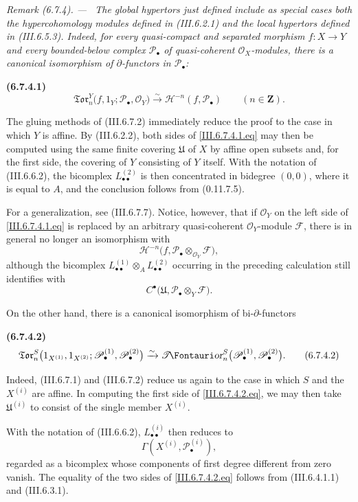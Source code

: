 \documentclass[10pt,oneside]{book}
\newcommand{\sh}[1]{\mathscr{#1}}
\newcommand{\shTor}{\sh{T}\textup{\kern-2.2pt{\Fontauri\slshape or}}}
\newcommand{\sref}[2][]{(#2)}
\newcommand{\oldpage}[2][]{\setcounter{footnote}{0}\marginpar{\scriptsize\textbf{#1}~|~#2}\ignorespaces}
\newenvironment{env}[1][]{\par\medskip\noindent\textbf{(#1)}\ }{\par}
\newenvironment{remark}[1][]{\par\medskip\noindent\itshape Remark (#1). ---\ }{\par}
\begin{document}
\begin{remark}[6.7.4]
\label{III.6.7.4}
The global hypertors just defined include as special cases both
the hypercohomology modules defined in \sref{III.6.2.1} and the
local hypertors defined in \sref{III.6.5.3}.  Indeed, for every
quasi-compact and separated morphism $f:X\to Y$ and every
bounded-below complex $\sh P_\bullet$ of quasi-coherent
$\sh O_X$-modules, there is a canonical isomorphism of
$\partial$-functors in $\sh P_\bullet$:
\begin{env}[6.7.4.1]
\label{III.6.7.4.1}
\[
  \mathfrak{Tor}_n^Y
  \bigl(
    f,1_Y;
    \sh P_\bullet,\sh O_Y
  \bigr)
  \xrightarrow{\sim}
  \sh H^{-n}(f,\sh P_\bullet)
  \qquad(n\in\mathbf Z).
  \tag{6.7.4.1}\label{III.6.7.4.1.eq}
\]
\end{env}
The gluing methods of \sref{III.6.7.2} immediately reduce the
proof to the case in which $Y$ is affine.  By
\sref{III.6.2.2}, both sides of
\eqref{III.6.7.4.1.eq} may then be computed using the same
finite covering $\mathfrak U$ of $X$ by affine open subsets and,
for the first side, the covering of $Y$ consisting of $Y$
itself.  With the notation of \sref{III.6.6.2}, the bicomplex
$L_{\bullet\bullet}^{(2)}$ is then concentrated in bidegree
$(0,0)$, where it is equal to $A$, and the conclusion follows
from \sref[0]{0.11.7.5}.

For a generalization, see \sref{III.6.7.7}.  Notice, however,
that if $\sh O_Y$ on the left side of
\eqref{III.6.7.4.1.eq} is replaced by an arbitrary
quasi-coherent $\sh O_Y$-module $\sh F$, there is in general no
longer an isomorphism with
\[
  \sh H^{-n}
  \bigl(
    f,\sh P_\bullet\otimes_{\sh O_Y}\sh F
  \bigr),
\]
although the bicomplex
$L_{\bullet\bullet}^{(1)}\otimes_A
 L_{\bullet\bullet}^{(2)}$ occurring in the preceding
calculation still identifies with
\[
  C^\bullet
  \bigl(
    \mathfrak U,
    \sh P_\bullet\otimes_Y\sh F
  \bigr).
\]

On the other hand, there is a canonical isomorphism of
bi-$\partial$-functors
\begin{env}[6.7.4.2]
\label{III.6.7.4.2}
\[
  \mathfrak{Tor}_n^S
  \bigl(
    1_{X^{(1)}},1_{X^{(2)}};
    \sh P_\bullet^{(1)},\sh P_\bullet^{(2)}
  \bigr)
  \xrightarrow{\sim}
  \shTor_n^S
  \bigl(
    \sh P_\bullet^{(1)},\sh P_\bullet^{(2)}
  \bigr).
  \tag{6.7.4.2}\label{III.6.7.4.2.eq}
\]
\end{env}
Indeed, \sref{III.6.7.1} and \sref{III.6.7.2} reduce us again to
the case in which $S$ and the $X^{(i)}$ are affine.  In
computing the first side of \eqref{III.6.7.4.2.eq}, we may then
take $\mathfrak U^{(i)}$ to consist of the single member
$X^{(i)}$.

\oldpage[III]{160}

With the notation of \sref{III.6.6.2},
$L_{\bullet\bullet}^{(i)}$ then reduces to
\[
  \Gamma(X^{(i)},\sh P_\bullet^{(i)}),
\]
regarded as a bicomplex whose components of first degree
different from zero vanish.  The equality of the two sides of
\eqref{III.6.7.4.2.eq} follows from \sref{III.6.4.1.1} and
\sref{III.6.3.1}.
\end{remark}
\end{document}
